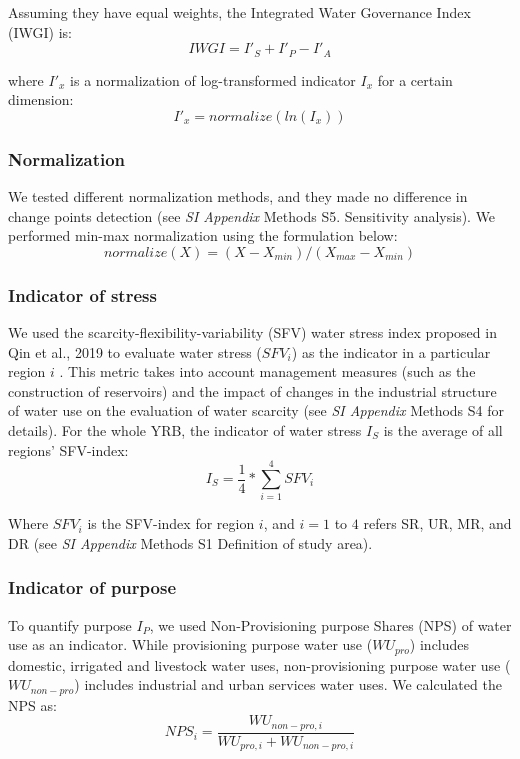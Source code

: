 	Assuming they have equal weights, the Integrated Water Governance Index (IWGI) is:
	\begin{equation}
		IWGI = I'_S + I'_P - I'_A
	\end{equation}

	where $I'_x$ is a normalization of log-transformed indicator $I_x$ for a certain dimension:
	\begin{equation}
		I'_x = normalize(ln(I_x))
	\end{equation}

	\subsubsection*{Normalization}
	We tested different normalization methods, and they made no difference in change points detection (see \textit{SI Appendix} Methods S5. Sensitivity analysis). We performed min-max normalization using the formulation below:
	\begin{equation}
		normalize(X) = (X - X_{min}) / (X_{max} - X_{min})
	\end{equation}

	\subsubsection*{Indicator of stress}
	We used the scarcity-flexibility-variability (SFV) water stress index proposed in Qin et al., 2019 to evaluate water stress ($SFV_i$) as the indicator in a particular region $i$ \cite{qinFlexibilityintensityglobal2019}. This metric takes into account management measures (such as the construction of reservoirs) and the impact of changes in the industrial structure of water use on the evaluation of water scarcity (see \textit{SI Appendix} Methods S4 for details). For the whole YRB, the indicator of water stress $I_S$ is the average of all regions' SFV-index:
	\begin{equation}
		I_S = \frac{1}{4} * \sum_{i=1}^4 SFV_{i}
	\end{equation}

	Where $SFV_i$ is the SFV-index for region $i$, and $i=1$ to $4$ refers SR, UR, MR, and DR (see \textit{SI Appendix} Methods S1 Definition of study area).

	\subsubsection*{Indicator of purpose}
	To quantify purpose $I_P$, we used Non-Provisioning purpose Shares (NPS) of water use as an indicator. While provisioning purpose water use ($WU_{pro}$) includes domestic, irrigated and livestock water uses, non-provisioning purpose water use ($WU_{non-pro}$) includes industrial and urban services water uses. We calculated the NPS as:
	\begin{equation}
		NPS_{i} = \frac{WU_{non-pro, i}}{WU_{pro, i} + WU_{non-pro, i}}
	\end{equation}

